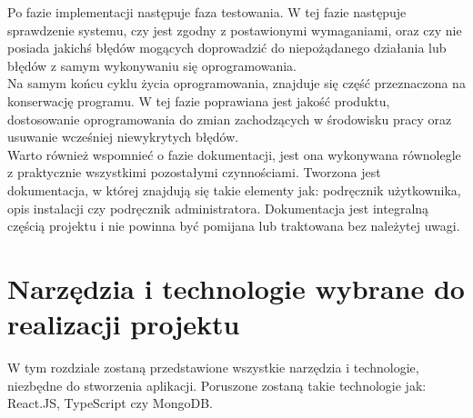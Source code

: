 \documentclass[12pt]{article}
\begin{document}
\begin{sloppypar}
{{    Po fazie implementacji następuje faza testowania. 
    W tej fazie następuje sprawdzenie systemu, czy jest zgodny z postawionymi wymaganiami, 
    oraz czy nie posiada jakichś błędów mogących doprowadzić do niepożądanego działania lub błędów z samym wykonywaniu się oprogramowania.\\
    Na samym końcu cyklu życia oprogramowania, znajduje się część przeznaczona na konserwację programu. 
    W tej fazie poprawiana jest jakość produktu, dostosowanie oprogramowania do zmian zachodzących w środowisku pracy oraz usuwanie wcześniej niewykrytych błędów.\\
    Warto również wspomnieć o fazie dokumentacji, jest ona wykonywana równolegle z praktycznie wszystkimi pozostałymi czynnościami. 
    Tworzona jest dokumentacja, w której znajdują się takie elementy jak: podręcznik użytkownika, opis instalacji czy podręcznik administratora. 
    Dokumentacja jest integralną częścią projektu i nie powinna być pomijana lub traktowana bez należytej uwagi.
  }
}

\section{Narzędzia i technologie wybrane do realizacji projektu}
{
  W tym rozdziale zostaną przedstawione wszystkie narzędzia i technologie, niezbędne do stworzenia aplikacji.
  Poruszone zostaną takie technologie jak: React.JS, TypeScript czy MongoDB.
}
\end{sloppypar}
\end{document}
